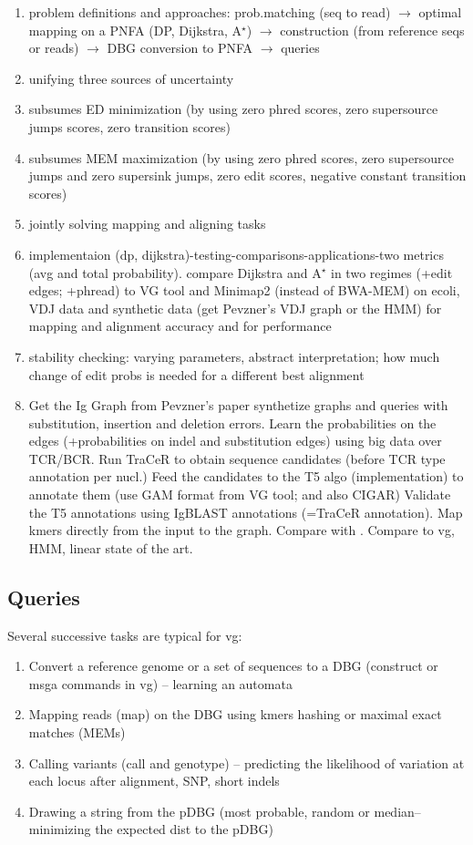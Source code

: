 \begin{enumerate}
	\item problem definitions and approaches: prob.matching (seq to read) $\to$ optimal mapping on a PNFA (DP, Dijkstra, A$^\star$) $\to$ construction (from reference seqs or reads) $\to$ DBG conversion to PNFA $\to$ queries
	\item unifying three sources of uncertainty
	\item subsumes ED minimization (by using zero phred scores, zero supersource jumps scores, zero transition scores)
	\item subsumes MEM maximization (by using zero phred scores, zero supersource jumps and zero supersink jumps, zero edit scores, negative constant transition scores)
	\item jointly solving mapping and aligning tasks
	\item implementaion (dp, dijkstra)-testing-comparisons-applications-two metrics (avg and total probability). compare Dijkstra and A$^\star$ in two regimes (+edit edges; +phread) to VG tool and Minimap2 (instead of BWA-MEM) on ecoli, VDJ data and synthetic data (get Pevzner’s VDJ graph or the HMM) for mapping and alignment accuracy and for performance
	\item stability checking: varying parameters, abstract interpretation; how much change of edit probs is needed for a different best alignment
	\item Get the Ig Graph from Pevzner's paper \cite{bonissone2015immunoglobulin} synthetize graphs and queries with substitution, insertion and deletion errors.	Learn the probabilities on the edges (+probabilities on indel and substitution edges) using big data over TCR/BCR. Run TraCeR to obtain sequence candidates (before TCR type annotation per nucl.) Feed the candidates to the T5 algo (implementation) to annotate them (use GAM format from VG tool; and also CIGAR) Validate the T5 annotations using IgBLAST annotations (=TraCeR annotation). Map kmers directly from the input to the graph. Compare with \cite{ralph2016consistency}. 	Compare to vg, HMM, linear state of the art. \\
\end{enumerate}

\subsection{Queries}

Several successive tasks are typical for vg:
\begin{enumerate}
	\item Convert a reference genome or a set of sequences to a DBG (construct or msga commands in vg) -- learning an automata
	\item Mapping reads (map) on the DBG using kmers hashing or maximal exact matches (MEMs)
	\item Calling variants (call and genotype) -- predicting the likelihood of variation at each locus after alignment, SNP, short indels	
	\item Drawing a string from the pDBG (most probable, random or median–minimizing the expected dist to the pDBG)
\end{enumerate}


